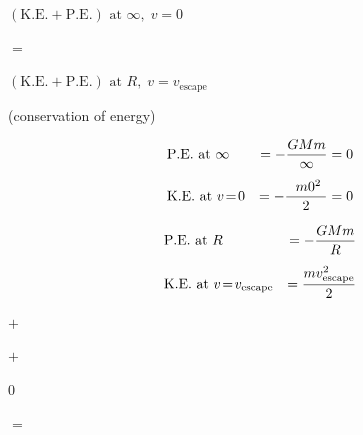 \documentclass[11pt,oneside]{article}
\begin{document}
\Needspace{0.45\textheight}
\begin{center}
\begin{minipage}[t]{0.307\linewidth}
\((\mathrm{K.E.}+\mathrm{P.E.})\text{ at }\infty,\;v\!=\!0\)
\end{minipage}\hfill
\begin{minipage}[t]{0.307\linewidth}
\(=\)
\end{minipage}\hfill
\begin{minipage}[t]{0.307\linewidth}
\((\mathrm{K.E.}+\mathrm{P.E.})\text{ at }R,\;v\!=\!v_\text{escape}\)
\end{minipage}\hfill
\par\medskip
\begin{minipage}[t]{0.307\linewidth}
(conservation of energy)
\end{minipage}\hfill
\par\medskip
\begin{minipage}[t]{0.307\linewidth}

\begin{equation*}
            \begin{alignedat}{3}
            &\mathrm{P.E.}\text{ at }\infty\hskip1em  &= -\frac{GMm}{\infty} &=0\\[1ex]
            &\mathrm{K.E.}\text{ at }v\!=\!0\hskip1em &=-\frac{~~m0^2~}{2}    &=0
            \end{alignedat}
            \end{equation*}

\end{minipage}\hfill
\begin{minipage}[t]{0.307\linewidth}

\begin{equation*}
            \begin{alignedat}{2}
            &\mathrm{P.E.}\text{ at }R &\hskip1em=-\frac{GMm}{R}\\[1ex]
            &\mathrm{K.E.}\text{ at }v\!=\!v_\text{escape}&\hskip1em=\frac{mv_\text{escape}^2}{2}
            \end{alignedat}
            \end{equation*}

\end{minipage}\hfill
\par\medskip
\begin{minipage}[t]{0.307\linewidth}
\(+\)
\end{minipage}\hfill
\begin{minipage}[t]{0.307\linewidth}
\(+\)
\end{minipage}\hfill
\par\medskip
\begin{minipage}[t]{0.307\linewidth}
\(0\)
\end{minipage}\hfill
\begin{minipage}[t]{0.307\linewidth}
\(=\)
\end{minipage}\hfill
\begin{minipage}[t]{0.307\linewidth}


\end{minipage}
\end{center}
\end{document}
